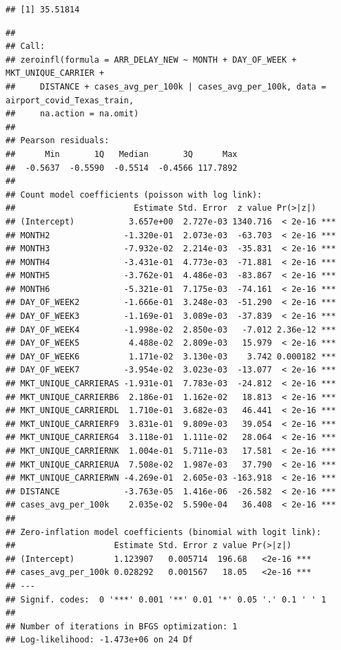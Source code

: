 \documentclass[
]{article}
\begin{document}
\begin{verbatim}
## [1] 35.51814
\end{verbatim}

\begin{verbatim}
## 
## Call:
## zeroinfl(formula = ARR_DELAY_NEW ~ MONTH + DAY_OF_WEEK + MKT_UNIQUE_CARRIER + 
##     DISTANCE + cases_avg_per_100k | cases_avg_per_100k, data = airport_covid_Texas_train, 
##     na.action = na.omit)
## 
## Pearson residuals:
##      Min       1Q   Median       3Q      Max 
##  -0.5637  -0.5590  -0.5514  -0.4566 117.7892 
## 
## Count model coefficients (poisson with log link):
##                        Estimate Std. Error  z value Pr(>|z|)    
## (Intercept)           3.657e+00  2.727e-03 1340.716  < 2e-16 ***
## MONTH2               -1.320e-01  2.073e-03  -63.703  < 2e-16 ***
## MONTH3               -7.932e-02  2.214e-03  -35.831  < 2e-16 ***
## MONTH4               -3.431e-01  4.773e-03  -71.881  < 2e-16 ***
## MONTH5               -3.762e-01  4.486e-03  -83.867  < 2e-16 ***
## MONTH6               -5.321e-01  7.175e-03  -74.161  < 2e-16 ***
## DAY_OF_WEEK2         -1.666e-01  3.248e-03  -51.290  < 2e-16 ***
## DAY_OF_WEEK3         -1.169e-01  3.089e-03  -37.839  < 2e-16 ***
## DAY_OF_WEEK4         -1.998e-02  2.850e-03   -7.012 2.36e-12 ***
## DAY_OF_WEEK5          4.488e-02  2.809e-03   15.979  < 2e-16 ***
## DAY_OF_WEEK6          1.171e-02  3.130e-03    3.742 0.000182 ***
## DAY_OF_WEEK7         -3.954e-02  3.023e-03  -13.077  < 2e-16 ***
## MKT_UNIQUE_CARRIERAS -1.931e-01  7.783e-03  -24.812  < 2e-16 ***
## MKT_UNIQUE_CARRIERB6  2.186e-01  1.162e-02   18.813  < 2e-16 ***
## MKT_UNIQUE_CARRIERDL  1.710e-01  3.682e-03   46.441  < 2e-16 ***
## MKT_UNIQUE_CARRIERF9  3.831e-01  9.809e-03   39.054  < 2e-16 ***
## MKT_UNIQUE_CARRIERG4  3.118e-01  1.111e-02   28.064  < 2e-16 ***
## MKT_UNIQUE_CARRIERNK  1.004e-01  5.711e-03   17.581  < 2e-16 ***
## MKT_UNIQUE_CARRIERUA  7.508e-02  1.987e-03   37.790  < 2e-16 ***
## MKT_UNIQUE_CARRIERWN -4.269e-01  2.605e-03 -163.918  < 2e-16 ***
## DISTANCE             -3.763e-05  1.416e-06  -26.582  < 2e-16 ***
## cases_avg_per_100k    2.035e-02  5.590e-04   36.408  < 2e-16 ***
## 
## Zero-inflation model coefficients (binomial with logit link):
##                    Estimate Std. Error z value Pr(>|z|)    
## (Intercept)        1.123907   0.005714  196.68   <2e-16 ***
## cases_avg_per_100k 0.028292   0.001567   18.05   <2e-16 ***
## ---
## Signif. codes:  0 '***' 0.001 '**' 0.01 '*' 0.05 '.' 0.1 ' ' 1 
## 
## Number of iterations in BFGS optimization: 1 
## Log-likelihood: -1.473e+06 on 24 Df
\end{verbatim}
\end{document}
